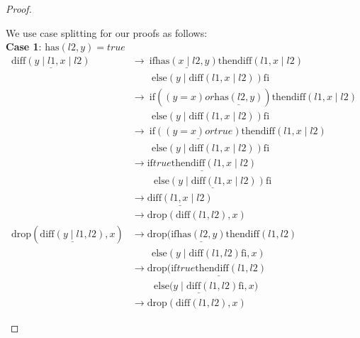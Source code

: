 \documentclass[12pt, a4paper]{article}
\newcommand{\rel}[1]{\mathrel{#1}}
\newcommand{\rmx}[1]{\mathrm{#1}}
\newcommand{\larrow}{\longrightarrow}
\newcommand{\under}{\underline}
\begin{document}
\begin{proof}
\begin{description}
We use case splitting for our proofs as follows: \\
\textbf{Case 1}: $\rmx{has}(l2, y) = true$
\begin{align*}
\under{\rmx{diff}(y \mid l1, x \mid l2)}
	&\larrow\ \rel{\rmx{if}} \under{\rmx{has}(x \mid l2, y)} \rel{\rmx{then}} \rmx{diff}(l1, x \mid l2) \\
	&\quad \quad \rel{\rmx{else}} (y \mid \rmx{diff}(l1, x \mid l2)) \rel{\rmx{fi}} \tag{by diff2} \\
	&\larrow\ \rel{\rmx{if}} ((y = x) \rel{or} \under{\rmx{has}(l2, y)}) \rel{\rmx{then}} \rmx{diff}(l1, x \mid l2) \\
	&\quad \quad \rel{\rmx{else}} (y \mid \rmx{diff}(l1, x \mid l2)) \rel{\rmx{fi}} \tag{by has2} \\
	&\larrow\ \rel{\rmx{if}} \under{((y = x) \rel{or} true)} \rel{\rmx{then}} \rmx{diff}(l1, x \mid l2) \\
	&\quad \quad \rel{\rmx{else}} (y \mid \rmx{diff}(l1, x \mid l2)) \rel{\rmx{fi}} \tag{by case splitting} \\
	&\larrow \under{\rel{\rmx{if}} true \rel{\rmx{then}} \rmx{diff}(l1, x \mid l2)} \\
	&\quad \quad\ \under{\rel{\rmx{else}} (y \mid \rmx{diff}(l1, x \mid l2)) \rel{\rmx{fi}}} \tag{by or} \\
	&\larrow \under{\rmx{diff}(l1, x \mid l2)} \tag{by if1} \\
	&\larrow \rmx{drop}(\rmx{diff}(l1, l2), x) \tag{by IH} \\
\rmx{drop}(\under{\rmx{diff}(y \mid l1, l2)}, x)
	&\larrow \rmx{drop}(\rel{\rmx{if}} \under{\rmx{has}(l2, y)} \rel{\rmx{then}} \rmx{diff}(l1, l2) \\
	&\quad \quad \rel{\rmx{else}} (y \mid \rmx{diff}(l1, l2) \rel{\rmx{fi}}, x) \tag{by diff2} \\
	&\larrow \rmx{drop}(\under{\rel{\rmx{if}} true \rel{\rmx{then}} \rmx{diff}(l1, l2)} \\
	&\quad \quad\ \under{\rel{\rmx{else}} (y \mid \rmx{diff}(l1, l2) \rel{\rmx{fi}}}, x) \tag{by case splitting} \\
	&\larrow \rmx{drop}(\rmx{diff}(l1, l2), x) \tag{by if1}
\end{align*}


\end{description}
\end{proof}
\end{document}

